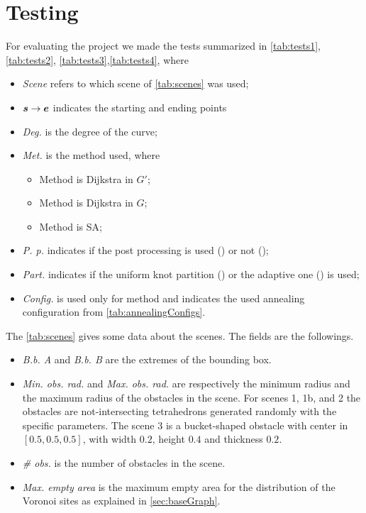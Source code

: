 \documentclass[dissertation.tex]{subfiles}
\begin{document}
\chapter{Testing}\label{cha:testing}
For evaluating the project we made the tests summarized in
\cref{tab:tests1}, \cref{tab:tests2}, \cref{tab:tests3},\cref{tab:tests4},
where
\begin{itemize}
\item \emph{Scene} refers to which scene of \cref{tab:scenes} was used;
\item $\boldsymbol{s}\rightarrow\boldsymbol{e}$ indicates the starting and ending points
\item \emph{Deg.} is the degree of the \bs curve;
\item \emph{Met.} is the method used, where
  \begin{itemize}
  \item Method \metA is Dijkstra in $G'$;
  \item Method \metB is Dijkstra in $G$;
  \item Method \metC is \acl{SA};
  \end{itemize}
\item \emph{P. p.} indicates if the post processing is used (\ypp) or
  not (\npp);
\item \emph{Part.} indicates if the uniform knot partition
  (\ukp) or the adaptive one (\akp) is used;
\item \emph{Config.} is used only for method \metC and indicates the
  used annealing configuration from \cref{tab:annealingConfigs}.
\end{itemize}

The \cref{tab:scenes} gives some data about the scenes. The fields are
the followings.
\begin{itemize}
\item \emph{B.b. A} and \emph{B.b. B} are the extremes of the bounding
  box.
\item \emph{Min. obs. rad.} and \emph{Max. obs. rad.} are respectively
  the minimum radius and the maximum radius of the obstacles in the
  scene. For scenes 1, 1b, and 2 the obstacles are not-intersecting
  tetrahedrons generated randomly with the specific parameters. The
  scene 3 is a bucket-shaped obstacle with center in $[0.5,0.5,0.5]$,
  with width $0.2$, height $0.4$ and thickness $0.2$.
\item \emph{\# obs.} is the number of obstacles in the scene.
\item \emph{Max. empty area} is the maximum empty area for the
  distribution of the Voronoi sites as explained in \cref{sec:baseGraph}.
\end{itemize}
\end{document}
